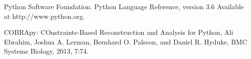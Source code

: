 \documentclass[12pt,spanish]{article}
\begin{document}



\begin{thebibliography}{1}

 Python Software Foundation. Python Language Reference, version 3.6 Available at http://www.python.org.

 COBRApy: COnstraints-Based Reconstruction and Analysis for Python,
Ali Ebrahim, Joshua A. Lerman, Bernhard O. Palsson, and Daniel R. Hyduke,
BMC Systems Biology, 2013, 7:74.

\end{thebibliography}
\end{document}
